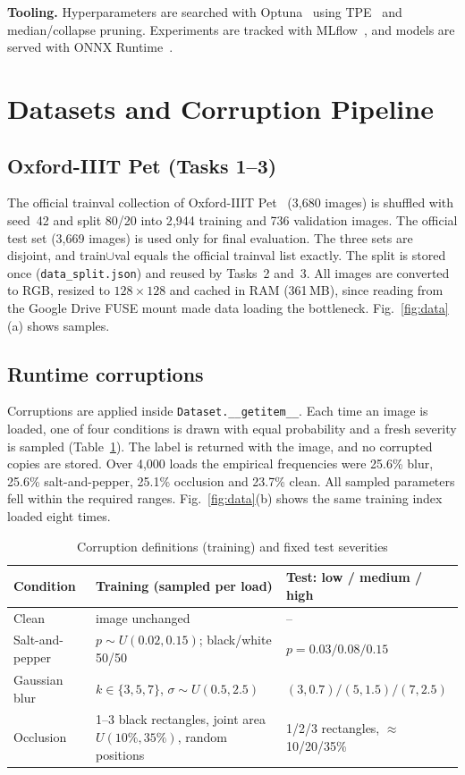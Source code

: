\documentclass[conference]{IEEEtran}
\begin{document}
\textbf{Tooling.} Hyperparameters are searched with Optuna~\cite{akiba2019optuna} using TPE~\cite{bergstra2011tpe} and median/collapse pruning. Experiments are tracked with MLflow~\cite{zaharia2018mlflow}, and models are served with ONNX Runtime~\cite{onnxruntime}.

\section{Datasets and Corruption Pipeline}\label{sec:data}
\subsection{Oxford-IIIT Pet (Tasks 1--3)}
The official trainval collection of Oxford-IIIT Pet~\cite{parkhi2012pets} (3{,}680 images) is shuffled with seed~42 and split 80/20 into 2{,}944 training and 736 validation images. The official test set (3{,}669 images) is used only for final evaluation. The three sets are disjoint, and train$\cup$val equals the official trainval list exactly. The split is stored once (\texttt{data\_split.json}) and reused by Tasks~2 and~3. All images are converted to RGB, resized to $128{\times}128$ and cached in RAM (361\,MB), since reading from the Google Drive FUSE mount made data loading the bottleneck. Fig.~\ref{fig:data}(a) shows samples.

\subsection{Runtime corruptions}
Corruptions are applied inside \texttt{Dataset.\_\_getitem\_\_}. Each time an image is loaded, one of four conditions is drawn with equal probability and a fresh severity is sampled (Table~\ref{tab:corr}). The label is returned with the image, and no corrupted copies are stored. Over 4{,}000 loads the empirical frequencies were 25.6\% blur, 25.6\% salt-and-pepper, 25.1\% occlusion and 23.7\% clean. All sampled parameters fell within the required ranges. Fig.~\ref{fig:data}(b) shows the same training index loaded eight times.

\begin{table}[!t]
\caption{Corruption definitions (training) and fixed test severities}
\label{tab:corr}
\centering\footnotesize
\begin{tabular}{@{}p{1.45cm}p{3.05cm}p{2.9cm}@{}}
\toprule
Condition & Training (sampled per load) & Test: low / medium / high\\
\midrule
Clean & image unchanged & --\\
Salt-and-pepper & $p\sim U(0.02,0.15)$; black/white 50/50 & $p=0.03/0.08/0.15$\\
Gaussian blur & $k\in\{3,5,7\}$, $\sigma\sim U(0.5,2.5)$ & $(3,0.7)/(5,1.5)/(7,2.5)$\\
Occlusion & 1--3 black rectangles, joint area $U(10\%,35\%)$, random positions & 1/2/3 rectangles, $\approx$10/20/35\%\\
\bottomrule
\end{tabular}
\end{table}
\end{document}
